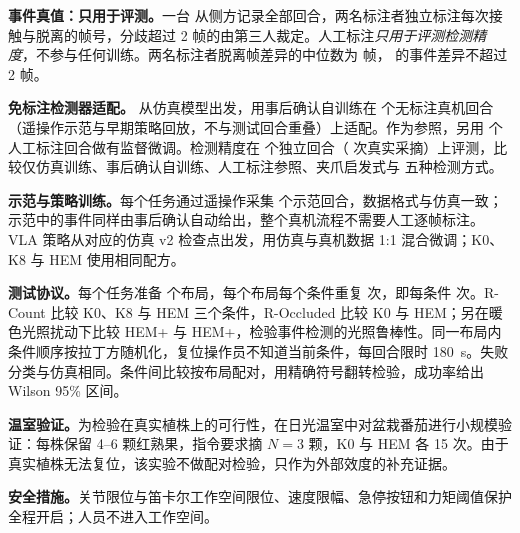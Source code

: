 \textbf{事件真值：只用于评测。}一台  从侧方记录全部回合，两名标注者独立标注每次接触与脱离的帧号，分歧超过 2 帧的由第三人裁定。人工标注\emph{只用于评测检测精度}，不参与任何训练。两名标注者脱离帧差异的中位数为  帧， 的事件差异不超过 2 帧。

\textbf{免标注检测器适配。}\pedet{} 从仿真模型出发，用事后确认自训练在  个无标注真机回合（遥操作示范与早期策略回放，不与测试回合重叠）上适配。作为参照，另用  个人工标注回合做有监督微调。检测精度在  个独立回合（ 次真实采摘）上评测，比较仅仿真训练、事后确认自训练、人工标注参照、夹爪启发式与 \fdm{} 五种检测方式。

\textbf{示范与策略训练。}每个任务通过遥操作采集  个示范回合，数据格式与仿真一致；示范中的事件同样由事后确认自动给出，整个真机流程不需要人工逐帧标注。VLA 策略从对应的仿真 v2 检查点出发，用仿真与真机数据 1:1 混合微调；K0、K8 与 HEM 使用相同配方。

\textbf{测试协议。}每个任务准备  个布局，每个布局每个条件重复  次，即每条件  次。R-Count 比较 K0、K8 与 HEM 三个条件，R-Occluded 比较 K0 与 HEM；另在暖色光照扰动下比较 HEM+\pedet{} 与 HEM+\fdm{}，检验事件检测的光照鲁棒性。同一布局内条件顺序按拉丁方随机化，复位操作员不知道当前条件，每回合限时 180~s。失败分类与仿真相同。条件间比较按布局配对，用精确符号翻转检验，成功率给出 Wilson 95\% 区间\cite{wilson1927probable}。

\textbf{温室验证。}为检验在真实植株上的可行性，在日光温室中对盆栽番茄进行小规模验证：每株保留 4--6 颗红熟果，指令要求摘 $N=3$ 颗，K0 与 HEM 各 15 次。由于真实植株无法复位，该实验不做配对检验，只作为外部效度的补充证据。

\textbf{安全措施。}关节限位与笛卡尔工作空间限位、速度限幅、急停按钮和力矩阈值保护全程开启；人员不进入工作空间。

